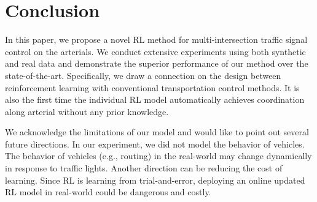 \section{Conclusion}
In this paper, we propose a novel RL method for multi-intersection traffic signal control on the arterials. We conduct extensive experiments using both synthetic and real data and demonstrate the superior performance of our method over the state-of-the-art. Specifically, we draw a connection on the design between reinforcement learning with conventional transportation control methods. It is also the first time the individual RL model automatically achieves coordination along arterial without any prior knowledge. 
 
 We acknowledge the limitations of our model and would like to point out several future directions. In our experiment, we did not model the behavior of vehicles. The behavior of vehicles (e.g., routing) in the real-world may change dynamically in response to traffic lights. Another direction can be reducing the cost of learning. Since RL is learning from trial-and-error, deploying an online updated RL model in real-world could be dangerous and costly.



% 
% 



% 
